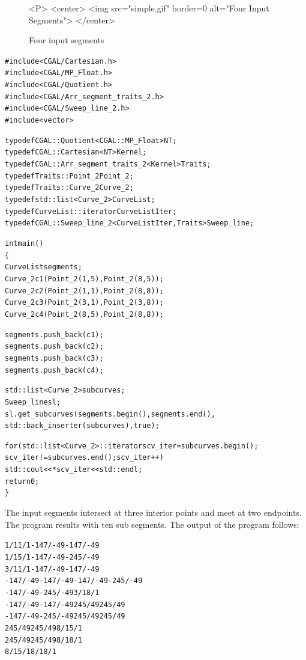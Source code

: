 \begin{figure}[hbp]
\caption{Four input segments
\label{SL_sec:simple}}

\begin{ccHtmlOnly}
<P>
<center>
  <img src="simple.gif" border=0 alt="Four Input Segments">
</center>
\end{ccHtmlOnly}
\end{figure}

\begin{alltt}
#include <CGAL/Cartesian.h>
#include <CGAL/MP_Float.h>
#include <CGAL/Quotient.h>
#include <CGAL/Arr_segment_traits_2.h>
#include <CGAL/Sweep_line_2.h>
#include <vector>

typedef CGAL::Quotient<CGAL::MP_Float>                  NT;
typedef CGAL::Cartesian<NT>                             Kernel;
typedef CGAL::Arr_segment_traits_2<Kernel>              Traits;
typedef Traits::Point_2                                 Point_2;
typedef Traits::Curve_2                                 Curve_2;
typedef std::list<Curve_2>                              CurveList;
typedef CurveList::iterator                             CurveListIter;
typedef CGAL::Sweep_line_2<CurveListIter, Traits>       Sweep_line;

int main()
\{
  CurveList  segments;
  Curve_2 c1(Point_2(1,5), Point_2(8,5));
  Curve_2 c2(Point_2(1,1), Point_2(8,8));
  Curve_2 c3(Point_2(3,1), Point_2(3,8));
  Curve_2 c4(Point_2(8,5), Point_2(8,8));

  segments.push_back(c1);
  segments.push_back(c2);
  segments.push_back(c3);
  segments.push_back(c4);

  std::list<Curve_2> subcurves;
  Sweep_line sl;
  sl.get_subcurves(segments.begin(), segments.end(), 
		   std::back_inserter(subcurves), true);
  
  for (std::list<Curve_2>::iterator scv_iter = subcurves.begin(); 
       scv_iter != subcurves.end(); scv_iter++)
    std::cout << *scv_iter << std::endl;
  return 0;
\}
\end{alltt}

The input segments intersect at three interior points and meet at two
endpoints. The program results with ten sub segments.
The output of the program follows:

\begin{alltt}
1/1 1/1 -147/-49 -147/-49
1/1 5/1 -147/-49 -245/-49
3/1 1/1 -147/-49 -147/-49
-147/-49 -147/-49 -147/-49 -245/-49
-147/-49 -245/-49 3/1 8/1
-147/-49 -147/-49 245/49 245/49
-147/-49 -245/-49 245/49 245/49
245/49 245/49 8/1 5/1
245/49 245/49 8/1 8/1
8/1 5/1 8/1 8/1
\end{alltt}
